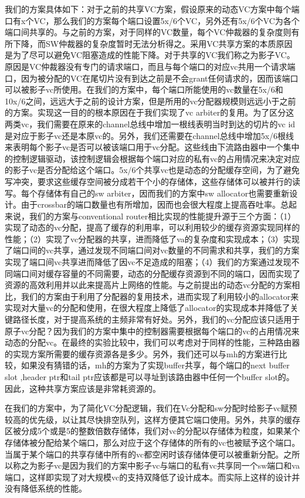 \documentclass[10pt,journal]{IEEEtran}
\begin{document}
我们的方案具体如下：对于之前的共享VC方案，假设原来的动态VC方案中每个端口有x个VC，那么我们的方案每个端口设置5x/6个VC，另外还有5x/6个VC为各个端口间共享的。与之前的方案，对于同样的VC数量，每个VC仲裁器的复杂度则有所下降，而SW仲裁器的复杂度暂时无法分析得之。采用VC共享方案的本质原因是为了尽可以避免VC阻塞造成的性能下降。对于共享的VC我们称之为影子VC。原因是VC仲裁器没有专门的请求端口，而且与每个端口的对应vc共用一个请求端口，因为被分配的VC在尾切片没有到达之前是不会grant任何请求的，因而该端口可以被影子vc所使用。在我们的方案中，每个端口所能使用的vc数量在5x/6和10x/6之间，远远大于之前的设计方案，但是所用的vc分配器规模则远远小于之前的方案。实现这一目的的根本原因在于我们实现了vc arbiter的复用。为了区分这两类vc，我们需要在原来的channel总线中增加一根线表明当时到达的切片的vc id是对应于影子vc还是本原vc的。另外，我们还需要在channel总线中增加5x/6根线来表明每个影子vc是否可以被该端口用于vc分配。这些线由下流路由器中一个集中的控制逻辑驱动，该控制逻辑会根据每个端口对应的私有vc的占用情况来决定对应的影子vc是否分配给这个端口。5x/6个共享vc也是动态的分配缓存空间，为了避免写冲突，要求这些缓存空间被分成若干个小的存储体，这些存储体可以被并行的读写。每个存储体有自己的sw arbiter，因而我们的方案中sw allocator也需要重新设计。由于crossbar的端口数量也有所增加，因而也会很大程度上提高吞吐率。总起来说，我们的方案与conventional router相比实现的性能提升源于三个方面：（1）实现了动态的vc分配，提高了缓存的利用率，可以利用较少的缓存资源实现同样的性能；（2）实现了vc分配器的共享，进而降低了va的复杂度和实现成本；（3）实现了端口间的vc共享，通过发现不同端口间对vc数量的不同需求和共享，我们的方案实现了端口间vc共享进而降低了因vc不足造成的阻塞；（4）我们的方案通过发现不同端口间对缓存容量的不同需要，动态的分配缓存资源到不同的端口，因而实现了资源的高效利用并以此来提高片上网络的性能。与之前提出的动态vc分配的方案相比，我们的方案由于利用了分配器的复用技术，进而实现了利用较小的allocator来实现对大量vc的分配和使用，在很大程度上降低了allocator的实现成本并降低了关键路径长度，对于提高系统的主频非常有好处。另外，我们的vc分配应该只适用于原子vc分配？因为我们的方案中集中的控制器需要根据每个端口的vc的占用情况来动态的分配vc。在最终的实验比较中，我们可以考虑对于同样的性能，三种路由器的实现方案所需要的缓存资源各是多少。另外，我们还可以与mh的方案进行比较，如果没有猜错的话，mh的方案为了实现buffer共享，每个端口的next buffer slot ,header ptr和tail ptr应该都是可以寻址到该路由器中任何一个buffer slot的。因此，这种共享方案应该是非常耗资源的。

在我们的方案中，为了简化VC分配逻辑，我们在Vc分配和sw分配时给影子vc赋预较高的优先级，以让其尽快排空队列，这样方便其它端口使用。另外，共享的缓存区被分成5个或是5的整数倍数存储体，我们对vc的分配以存储体为粒度，如果某个存储体被分配给某个端口，那么对应于这个存储体的所有的vc也被赋予这个端口。当属于某个端口的共享存储中所有的vc都空闲时该存储体便可以被重新分配。之所以称之为影子vc是因为我们的方案中影子vc与端口的私有vc共享同一个sw端口和va端口，这样即实现了对大规模vc的支持双降低了设计成本。而实际上这样的设计并没有降低系统的性能。
\end{document}
